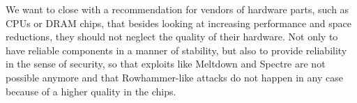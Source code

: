 We want to close with a recommendation for vendors of hardware parts, such as
CPUs or DRAM chips, that besides looking at increasing performance and space
reductions, they should not neglect the quality of their hardware. Not only to
have reliable components in a manner of stability, but also to provide
reliability in the sense of security, so that exploits like Meltdown and Spectre
are not possible anymore and that Rowhammer-like attacks do not happen in any
case because of a higher quality in the chips.

